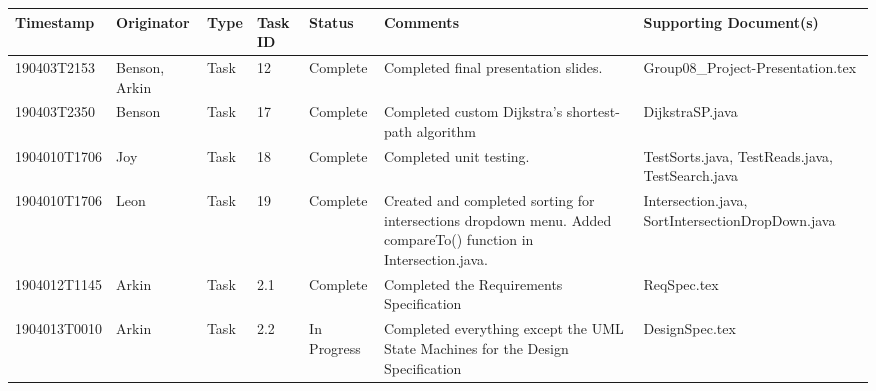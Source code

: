 \documentclass[12pt]{article}
\begin{document}
\begin{center}
    \begin{tabular}{| P{2.5cm} | P{2.2cm} | P{1.4cm} | P{0.9cm} | P{1.9cm} | P{2.8cm} | P{3cm} |}
        \hline
        \textbf{Timestamp} & \textbf{Originator} & \textbf{Type} 
        & \textbf{Task ID} & \textbf{Status} & \textbf{Comments} 
        & \textbf{Supporting Document(s)}\\
        \hline
        190403T2153 & Benson, Arkin & Task & 12 & Complete & Completed final presentation slides. & Group08\_Project-Presentation.tex \\
        \hline
        190403T2350 & Benson & Task & 17 & Complete & Completed custom Dijkstra's shortest-path algorithm & DijkstraSP.java \\
        \hline
        1904010T1706 & Joy & Task & 18 & Complete & Completed unit testing. & TestSorts.java, TestReads.java, TestSearch.java \\
        \hline
        1904010T1706 & Leon & Task & 19 & Complete & Created and completed sorting for intersections dropdown menu. Added compareTo() function in Intersection.java.
        & Intersection.java, SortIntersectionDropDown.java \\
        \hline
        1904012T1145 & Arkin & Task & 2.1 & Complete & Completed the Requirements Specification & ReqSpec.tex \\
        \hline
        1904013T0010 & Arkin & Task & 2.2 & In Progress & Completed everything except the UML State Machines for the Design Specification & DesignSpec.tex \\
        \hline
    \end{tabular}
    \end{center}
\end{document}
